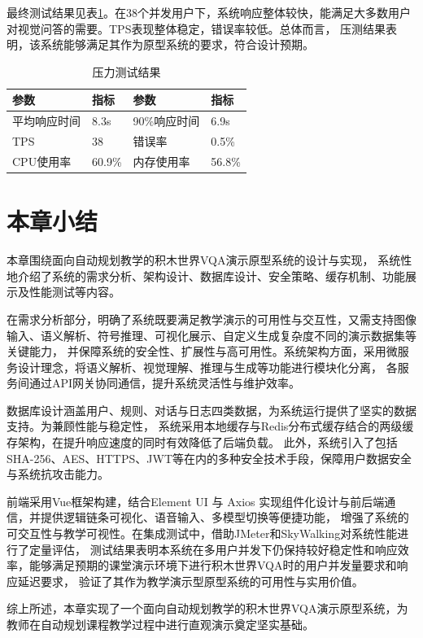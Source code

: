 最终测试结果见表\ref{tab:test_result}。在38个并发用户下，系统响应整体较快，能满足大多数用户对视觉问答的需要。TPS表现整体稳定，错误率较低。总体而言，
压测结果表明，该系统能够满足其作为原型系统的要求，符合设计预期。
\begin{table}[h]
    \centering
    \renewcommand{\arraystretch}{1.3} %
    \begin{tabular}{|l|l|l|l|}
        \hline
        \textbf{参数} & \textbf{指标} & \textbf{参数} & \textbf{指标} \\
        \hline
        平均响应时间 & 8.3s & 90\%响应时间 & 6.9s \\
        \hline
        TPS & 38 & 错误率 & 0.5\% \\
        \hline
        CPU使用率 & 60.9\% & 内存使用率 & 56.8\% \\
        \hline
    \end{tabular}
    \caption{压力测试结果}
    \label{tab:test_result}
\end{table}
\section{本章小结}
本章围绕面向自动规划教学的积木世界VQA演示原型系统的设计与实现，
系统性地介绍了系统的需求分析、架构设计、数据库设计、安全策略、缓存机制、功能展示及性能测试等内容。

在需求分析部分，明确了系统既要满足教学演示的可用性与交互性，又需支持图像输入、语义解析、符号推理、可视化展示、自定义生成复杂度不同的演示数据集等关键能力，
并保障系统的安全性、扩展性与高可用性。系统架构方面，采用微服务设计理念，将语义解析、视觉理解、推理与生成等功能进行模块化分离，
各服务间通过API网关协同通信，提升系统灵活性与维护效率。

数据库设计涵盖用户、规则、对话与日志四类数据，为系统运行提供了坚实的数据支持。为兼顾性能与稳定性，
系统采用本地缓存与Redis分布式缓存结合的两级缓存架构，在提升响应速度的同时有效降低了后端负载。
此外，系统引入了包括SHA-256、AES、HTTPS、JWT等在内的多种安全技术手段，保障用户数据安全与系统抗攻击能力。

前端采用Vue框架构建，结合Element UI 与 Axios 实现组件化设计与前后端通信，并提供逻辑链条可视化、语音输入、多模型切换等便捷功能，
增强了系统的可交互性与教学可视性。在集成测试中，借助JMeter和SkyWalking对系统性能进行了定量评估，
测试结果表明本系统在多用户并发下仍保持较好稳定性和响应效率，能够满足预期的课堂演示环境下进行积木世界VQA时的用户并发量要求和响应延迟要求，
验证了其作为教学演示型原型系统的可用性与实用价值。

综上所述，本章实现了一个面向自动规划教学的积木世界VQA演示原型系统，为教师在自动规划课程教学过程中进行直观演示奠定坚实基础。